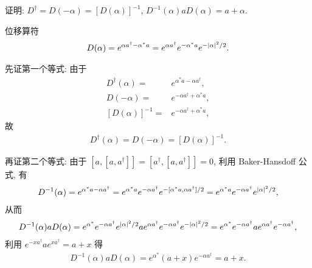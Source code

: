 \documentclass{assignment}
\begin{document}
\begin{prob}
    证明: $D^{\dagger}=D(-\alpha)=[D(\alpha)]^{-1}$, $D^{-1}(\alpha)aD(\alpha)=a+\alpha$.
\end{prob}
\begin{pf}
    位移算符
    \begin{align}
        D(\alpha)=e^{\alpha a^{\dagger}-\alpha^*a}=e^{\alpha a^{\dagger}}e^{-\alpha^*a}e^{-\left\lvert\alpha\right\rvert^2/2}.
    \end{align}

    先证第一个等式: 由于
    \begin{align}
        D^{\dagger}(\alpha)=&e^{\alpha^*a-\alpha a^{\dagger}},\\
        D(-\alpha)=&e^{-\alpha a^{\dagger}+\alpha^*a},\\
        [D(\alpha)]^{-1}=&e^{-\alpha a^{\dagger}+\alpha^*a},
    \end{align}
    故
    \begin{align}
        D^{\dagger}(\alpha)=D(-\alpha)=[D(\alpha)]^{-1}.
    \end{align}

    再证第二个等式: 由于 $[a,[a,a^{\dagger}]]=[a^{\dagger},[a,a^{\dagger}]]=0$, 利用 Baker-Hansdoff 公式, 有
    \begin{align}
        D^{-1}(\alpha)=e^{\alpha^*a-\alpha a^{\dagger}}=e^{\alpha^*a}e^{-\alpha a^{\dagger}}e^{-[\alpha^*a,\alpha a^{\dagger}]/2}=e^{\alpha^*a}e^{-\alpha a^{\dagger}}e^{\left\lvert\alpha\right\rvert^2/2},
    \end{align}
    从而
    \begin{align}
        D^{-1}(\alpha)aD(\alpha)=e^{\alpha^*}e^{-\alpha a^{\dagger}}e^{\left\lvert\alpha\right\rvert^2/2}ae^{\alpha a^{\dagger}}e^{-\alpha a^{\dagger}}e^{-\left\lvert\alpha\right\rvert^2/2}=e^{\alpha^*}e^{-\alpha a^{\dagger}}ae^{\alpha a^{\dagger}}e^{-\alpha a^{\dagger}},
    \end{align}
    利用 $e^{-xa^{\dagger}}ae^{xa^{\dagger}}=a+x$ 得
    \begin{align}
        D^{-1}(\alpha)aD(\alpha)=e^{\alpha^*}(a+x)e^{-\alpha a^{\dagger}}=a+x.
    \end{align}
\end{pf}
\end{document}

